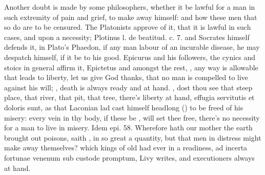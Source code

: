 Another doubt is made by some philosophers, whether it be lawful for a
man in such extremity of pain and grief, to make away himself: and how
these men that so do are to be censured. The Platonists approve of it,
that it is lawful in such cases, and upon a necessity; Plotinus l. de
beatitud. c. 7. and Socrates himself defends it, in Plato's Phaedon, if
any man labour of an incurable disease, he may despatch himself, if it
be to his good. Epicurus and his followers, the cynics and stoics in
general affirm it, Epictetus and \Seneca{} amongst the rest,
, any way is allowable that
leads to liberty, let us give God thanks, that no man is
compelled to live against his will;  , death is always ready and at
hand. , dost thou see that
steep place, that river, that pit, that tree, there's liberty at hand,
effugia servitutis et doloris sunt, as that Laconian lad cast himself
headlong () to be freed of his misery: every
vein in thy body, if these be , will set thee free,
 there's no necessity for a
man to live in misery.  Idem epi. 58. Wherefore hath our mother
the earth brought out poisons, saith \Pliny{}, in so great a
quantity, but that men in distress might make away themselves? which
kings of old had ever in a readiness, ad incerta fortunae venenum sub
custode promptum, Livy writes, and executioners always at hand.

